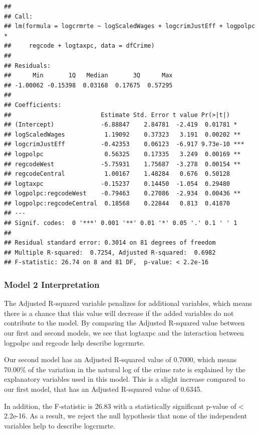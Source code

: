 \documentclass[]{article}
\begin{document}
\begin{verbatim}
## 
## Call:
## lm(formula = logcrmrte ~ logScaledWages + logcrimJustEff + logpolpc * 
##     regcode + logtaxpc, data = dfCrime)
## 
## Residuals:
##      Min       1Q   Median       3Q      Max 
## -1.00062 -0.15398  0.03168  0.17675  0.57295 
## 
## Coefficients:
##                         Estimate Std. Error t value Pr(>|t|)    
## (Intercept)             -6.88847    2.84781  -2.419  0.01781 *  
## logScaledWages           1.19092    0.37323   3.191  0.00202 ** 
## logcrimJustEff          -0.42353    0.06123  -6.917 9.73e-10 ***
## logpolpc                 0.56325    0.17335   3.249  0.00169 ** 
## regcodeWest             -5.75931    1.75687  -3.278  0.00154 ** 
## regcodeCentral           1.00167    1.48284   0.676  0.50128    
## logtaxpc                -0.15237    0.14450  -1.054  0.29480    
## logpolpc:regcodeWest    -0.79463    0.27086  -2.934  0.00436 ** 
## logpolpc:regcodeCentral  0.18568    0.22844   0.813  0.41870    
## ---
## Signif. codes:  0 '***' 0.001 '**' 0.01 '*' 0.05 '.' 0.1 ' ' 1
## 
## Residual standard error: 0.3014 on 81 degrees of freedom
## Multiple R-squared:  0.7254, Adjusted R-squared:  0.6982 
## F-statistic: 26.74 on 8 and 81 DF,  p-value: < 2.2e-16
\end{verbatim}

\hypertarget{model-2-interpretation}{%
\subsubsection{Model 2 Interpretation}\label{model-2-interpretation}}

The Adjusted R-squared variable penalizes for additional variables,
which means there is a chance that this value will decrease if the added
variables do not contribute to the model. By comparing the Adjusted
R-squared value between our first and second models, we see that
logtaxpc and the interaction between logpolpc and regcode help describe
logcrmrte.

Our second model has an Adjusted R-squared value of 0.7000, which means
70.00\% of the variation in the natural log of the crime rate is
explained by the explanatory variables used in this model. This is a
slight increase compared to our first model, that has an Adjusted
R-squared value of 0.6345.

In addition, the F-statistic is 26.83 with a statistically significant
p-value of \textless{} 2.2e-16. As a result, we reject the null
hypothesis that none of the independent variables help to describe
logcrmrte.
\end{document}
